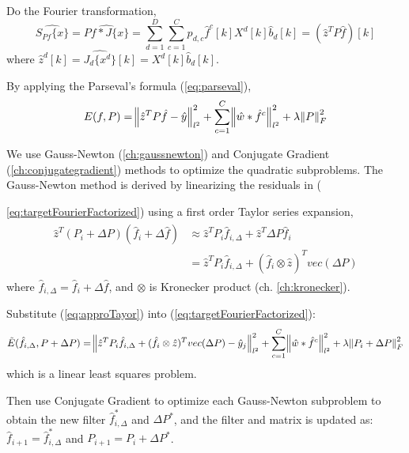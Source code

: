 \documentclass[12pt]{article}
\numberwithin{equation}{section}
\begin{document}
Do the Fourier transformation, 
\begin{equation}
	\widehat{S_{Pf}\{x\}} =\widehat{Pf*J\{x\}}
	=\sum^D_{d=1}\sum^C_{c=1}p_{d,c}\hat{f}^c[k]X^d[k]\hat{b}_d[k]
	=(\hat{z}^TP\hat{f})[k]
\end{equation}
where $\hat{z}^d[k]=\widehat{J_d\{x^d\}}[k]=X^d[k]\hat{b}_d[k]$. \par
By applying the Parseval's formula (\ref{eq:parseval}), 
\begin{equation} \label{eq:targetFourierFactorized}
	E(f, P)=\norm{\hat{z}^TP\hat{f}-\hat{y}}^2_{l^2}
		 + \sum^C_{c=1} \norm{\hat{w} * \hat{f}^c}^2_{l^2}
		 + \lambda \norm{P}^2_F
\end{equation} \par
We use Gauss-Newton (\ref{ch:gaussnewton})  and Conjugate Gradient (\ref{ch:conjugategradient}) methods to optimize the quadratic subproblems. The Gauss-Newton method is derived by linearizing the residuals in ({\ref{eq:targetFourierFactorized}) using a first order Taylor series expansion, 
\begin{align} \begin{split} \label{eq:approTayor}
	\hat{z}^T(P_i+\Delta P)(\hat{f}_i+\Delta\hat{f}) 
	&\approx \hat{z}^T P_i \hat{f}_{i, \Delta} +  \hat{z}^T \Delta P \hat{f}_{i} \\
	&= \hat{z}^T P_i \hat{f}_{i, \Delta} + (\hat{f}_i \otimes \hat{z})^T vec(\Delta P)
\end{split}\end{align} 
where $\hat{f}_{i, \Delta} = \hat{f}_i + \Delta \hat{f}$, and $\otimes$ is Kronecker product (ch. \ref{ch:kronecker}). \par
Substitute (\ref{eq:approTayor}) into (\ref{eq:targetFourierFactorized}):
\begin{equation} \label{eq:factorizedConvGaussNewton}
	\tilde{E}(\hat{f}_{i, \Delta}, P+\Delta P)
		=\norm{\hat{z}^TP_i\hat{f}_{i, \Delta}+ (\hat{f}_i \otimes \hat{z})^T vec(\Delta P)
 -\hat{y}_j}^2_{l^2}
		 + \sum^C_{c=1} \norm{\hat{w} * \hat{f}^c}^2_{l^2}
		 + \lambda \norm{P_i + \Delta P}^2_F
\end{equation} 
which is a linear least squares problem. \par
Then use Conjugate Gradient to optimize each Gauss-Newton subproblem to obtain the new filter 
$\hat{f}^*_{i, \Delta}$ and $\Delta P^*$, and the filter and matrix is updated as: $\hat{f}_{i+1}=\hat{f}^*_{i, \Delta}$
and $P_{i+1}=P_i+\Delta P^*$. \par
}
\end{document}
